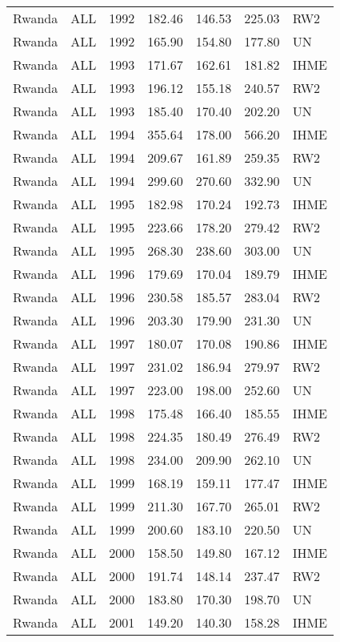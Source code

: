 \begin{longtable}{lllrrrl}
  Rwanda & ALL & 1992 & 182.46 & 146.53 & 225.03 & RW2 \\ 
  Rwanda & ALL & 1992 & 165.90 & 154.80 & 177.80 & UN \\ 
  Rwanda & ALL & 1993 & 171.67 & 162.61 & 181.82 & IHME \\ 
  Rwanda & ALL & 1993 & 196.12 & 155.18 & 240.57 & RW2 \\ 
  Rwanda & ALL & 1993 & 185.40 & 170.40 & 202.20 & UN \\ 
  Rwanda & ALL & 1994 & 355.64 & 178.00 & 566.20 & IHME \\ 
  Rwanda & ALL & 1994 & 209.67 & 161.89 & 259.35 & RW2 \\ 
  Rwanda & ALL & 1994 & 299.60 & 270.60 & 332.90 & UN \\ 
  Rwanda & ALL & 1995 & 182.98 & 170.24 & 192.73 & IHME \\ 
  Rwanda & ALL & 1995 & 223.66 & 178.20 & 279.42 & RW2 \\ 
  Rwanda & ALL & 1995 & 268.30 & 238.60 & 303.00 & UN \\ 
  Rwanda & ALL & 1996 & 179.69 & 170.04 & 189.79 & IHME \\ 
  Rwanda & ALL & 1996 & 230.58 & 185.57 & 283.04 & RW2 \\ 
  Rwanda & ALL & 1996 & 203.30 & 179.90 & 231.30 & UN \\ 
  Rwanda & ALL & 1997 & 180.07 & 170.08 & 190.86 & IHME \\ 
  Rwanda & ALL & 1997 & 231.02 & 186.94 & 279.97 & RW2 \\ 
  Rwanda & ALL & 1997 & 223.00 & 198.00 & 252.60 & UN \\ 
  Rwanda & ALL & 1998 & 175.48 & 166.40 & 185.55 & IHME \\ 
  Rwanda & ALL & 1998 & 224.35 & 180.49 & 276.49 & RW2 \\ 
  Rwanda & ALL & 1998 & 234.00 & 209.90 & 262.10 & UN \\ 
  Rwanda & ALL & 1999 & 168.19 & 159.11 & 177.47 & IHME \\ 
  Rwanda & ALL & 1999 & 211.30 & 167.70 & 265.01 & RW2 \\ 
  Rwanda & ALL & 1999 & 200.60 & 183.10 & 220.50 & UN \\ 
  Rwanda & ALL & 2000 & 158.50 & 149.80 & 167.12 & IHME \\ 
  Rwanda & ALL & 2000 & 191.74 & 148.14 & 237.47 & RW2 \\ 
  Rwanda & ALL & 2000 & 183.80 & 170.30 & 198.70 & UN \\ 
  Rwanda & ALL & 2001 & 149.20 & 140.30 & 158.28 & IHME \\ 

\end{longtable}
